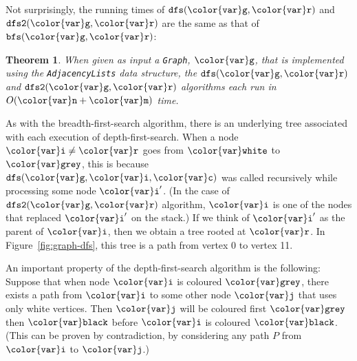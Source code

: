 \documentclass[10pt]{book}
\newcommand{\figref}[1]{Figure~\ref{fig:#1}}
\theoremstyle{plain}
\newtheorem{thm}{Theorem}[chapter]
\newcommand{\thmlabel}[1]{\label{thm:#1}}
\theoremstyle{definition}
\begin{document}
Not surprisingly, the running times of \ensuremath{\mathtt{dfs({\color{var}g},{\color{var}r})}} and \ensuremath{\mathtt{dfs2({\color{var}g},{\color{var}r})}} are the
same as that of \ensuremath{\mathtt{bfs({\color{var}g},{\color{var}r})}}:
\begin{thm}\thmlabel{dfs-graph}
  When given as input a \texttt{Graph}, \ensuremath{\mathtt{{\color{var}g}}}, that is implemented using the
  \texttt{AdjacencyLists} data structure, the \ensuremath{\mathtt{dfs({\color{var}g},{\color{var}r})}} and \ensuremath{\mathtt{dfs2({\color{var}g},{\color{var}r})}} algorithms
  each run in $O(\ensuremath{\mathtt{{\color{var}n}}}+\ensuremath{\mathtt{{\color{var}m}}})$ time.
\end{thm}

As with the breadth-first-search algorithm, there is an underlying
tree associated with each execution of depth-first-search.  When a node
$\ensuremath{\mathtt{{\color{var}i}}}\neq \ensuremath{\mathtt{{\color{var}r}}}$ goes from \ensuremath{\mathtt{{\color{var}white}}} to \ensuremath{\mathtt{{\color{var}grey}}}, this is because \ensuremath{\mathtt{dfs({\color{var}g},{\color{var}i},{\color{var}c})}}
was called recursively while processing some node \ensuremath{\mathtt{{\color{var}i}'}}.  (In the case
of \ensuremath{\mathtt{dfs2({\color{var}g},{\color{var}r})}} algorithm, \ensuremath{\mathtt{{\color{var}i}}} is one of the nodes that replaced \ensuremath{\mathtt{{\color{var}i}'}}
on the stack.)  If we think of \ensuremath{\mathtt{{\color{var}i}'}} as the parent of \ensuremath{\mathtt{{\color{var}i}}}, then we obtain
a tree rooted at \ensuremath{\mathtt{{\color{var}r}}}.  In \figref{graph-dfs}, this tree is a path from
vertex 0 to vertex 11.

An important property of the depth-first-search algorithm is the
following: Suppose that when node \ensuremath{\mathtt{{\color{var}i}}} is coloured \ensuremath{\mathtt{{\color{var}grey}}}, there exists a path
from \ensuremath{\mathtt{{\color{var}i}}} to some other node \ensuremath{\mathtt{{\color{var}j}}} that uses only white vertices.  Then \ensuremath{\mathtt{{\color{var}j}}}
will be coloured first \ensuremath{\mathtt{{\color{var}grey}}} then \ensuremath{\mathtt{{\color{var}black}}} before \ensuremath{\mathtt{{\color{var}i}}} is coloured \ensuremath{\mathtt{{\color{var}black}}}.
(This can be proven by contradiction, by considering any path $P$ from \ensuremath{\mathtt{{\color{var}i}}}
to \ensuremath{\mathtt{{\color{var}j}}}.)
\end{document}
